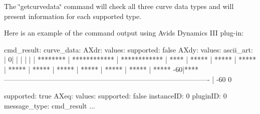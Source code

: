  The \char`\"{}getcurvedata\char`\"{} command will check all three curve data types and will present information for each supported type.

 Here is an example of the command output using Avid\textquotesingle{}s Dynamics I\+II plug-\/in\+: \begin{DoxyVerb}cmd_result:
  curve_data:
	AXdr:
	  values:
		supported: false
	AXdy:
	  values:
		ascii_art: |
				0|                                                                                
				 |                                                                                
				 |                                                                                
				 |                                                                                
				 |                                                                                
				 |                                                                        ********
				 |                                                            ************        
				 |                                                ************                    
				 |                                            ****                                
				 |                                       *****                                    
				 |                                   *****                                        
				 |                               *****                                            
				 |                           *****                                                
				 |                       *****                                                    
				 |                   *****                                                        
				 |               *****                                                            
				 |           *****                                                                
				 |       *****                                                                    
				 |   *****                                                                        
			  -60|****                                                                            
		  ----------------------------------------------------------------------------------------
				 | -60                                                                           0
	  
		supported: true
	AXeq:
	  values:
		supported: false
  instanceID: 0
  pluginID: 0
message_type: cmd_result
...\end{DoxyVerb}
 

